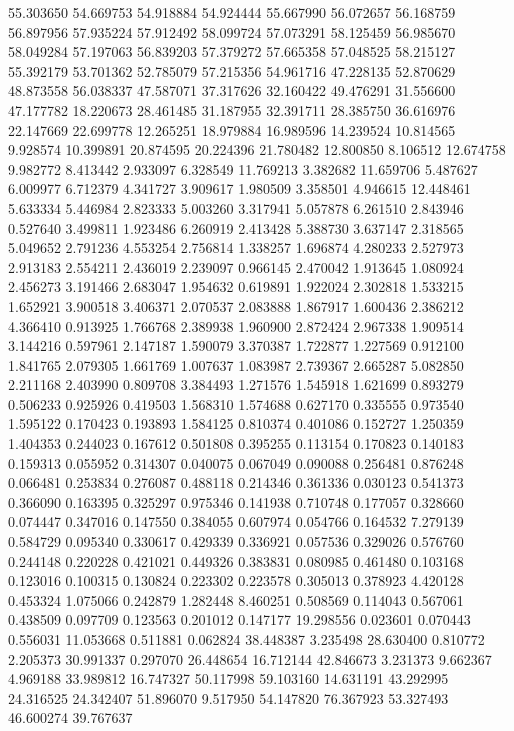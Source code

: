 55.303650
54.669753
54.918884
54.924444
55.667990
56.072657
56.168759
56.897956
57.935224
57.912492
58.099724
57.073291
58.125459
56.985670
58.049284
57.197063
56.839203
57.379272
57.665358
57.048525
58.215127
55.392179
53.701362
52.785079
57.215356
54.961716
47.228135
52.870629
48.873558
56.038337
47.587071
37.317626
32.160422
49.476291
31.556600
47.177782
18.220673
28.461485
31.187955
32.391711
28.385750
36.616976
22.147669
22.699778
12.265251
18.979884
16.989596
14.239524
10.814565
9.928574
10.399891
20.874595
20.224396
21.780482
12.800850
8.106512
12.674758
9.982772
8.413442
2.933097
6.328549
11.769213
3.382682
11.659706
5.487627
6.009977
6.712379
4.341727
3.909617
1.980509
3.358501
4.946615
12.448461
5.633334
5.446984
2.823333
5.003260
3.317941
5.057878
6.261510
2.843946
0.527640
3.499811
1.923486
6.260919
2.413428
5.388730
3.637147
2.318565
5.049652
2.791236
4.553254
2.756814
1.338257
1.696874
4.280233
2.527973
2.913183
2.554211
2.436019
2.239097
0.966145
2.470042
1.913645
1.080924
2.456273
3.191466
2.683047
1.954632
0.619891
1.922024
2.302818
1.533215
1.652921
3.900518
3.406371
2.070537
2.083888
1.867917
1.600436
2.386212
4.366410
0.913925
1.766768
2.389938
1.960900
2.872424
2.967338
1.909514
3.144216
0.597961
2.147187
1.590079
3.370387
1.722877
1.227569
0.912100
1.841765
2.079305
1.661769
1.007637
1.083987
2.739367
2.665287
5.082850
2.211168
2.403990
0.809708
3.384493
1.271576
1.545918
1.621699
0.893279
0.506233
0.925926
0.419503
1.568310
1.574688
0.627170
0.335555
0.973540
1.595122
0.170423
0.193893
1.584125
0.810374
0.401086
0.152727
1.250359
1.404353
0.244023
0.167612
0.501808
0.395255
0.113154
0.170823
0.140183
0.159313
0.055952
0.314307
0.040075
0.067049
0.090088
0.256481
0.876248
0.066481
0.253834
0.276087
0.488118
0.214346
0.361336
0.030123
0.541373
0.366090
0.163395
0.325297
0.975346
0.141938
0.710748
0.177057
0.328660
0.074447
0.347016
0.147550
0.384055
0.607974
0.054766
0.164532
7.279139
0.584729
0.095340
0.330617
0.429339
0.336921
0.057536
0.329026
0.576760
0.244148
0.220228
0.421021
0.449326
0.383831
0.080985
0.461480
0.103168
0.123016
0.100315
0.130824
0.223302
0.223578
0.305013
0.378923
4.420128
0.453324
1.075066
0.242879
1.282448
8.460251
0.508569
0.114043
0.567061
0.438509
0.097709
0.123563
0.201012
0.147177
19.298556
0.023601
0.070443
0.556031
11.053668
0.511881
0.062824
38.448387
3.235498
28.630400
0.810772
2.205373
30.991337
0.297070
26.448654
16.712144
42.846673
3.231373
9.662367
4.969188
33.989812
16.747327
50.117998
59.103160
14.631191
43.292995
24.316525
24.342407
51.896070
9.517950
54.147820
76.367923
53.327493
46.600274
39.767637
